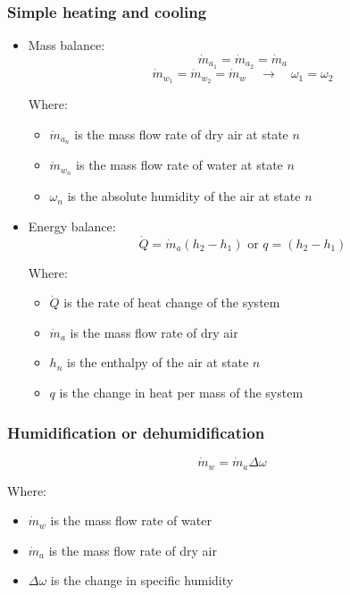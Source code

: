 \documentclass[11pt]{article}
\begin{document}
\subsubsection{Simple heating and cooling}
\label{sec:org114ebf3}
\begin{itemize}
\item Mass balance:
\[\dot{m}_{a_1} = \dot{m}_{a_2} = \dot{m}_a\]
\[\dot{m}_{w_1} = \dot{m}_{w_2} = \dot{m}_w \quad \rightarrow \quad \omega_1 = \omega_2\]

Where:
\begin{itemize}
\item \(\dot{m}_{a_n}\) is the mass flow rate of dry air at state \(n\)
\item \(\dot{m}_{w_n}\) is the mass flow rate of water at state \(n\)
\item \(\omega_n\) is the absolute humidity of the air at state \(n\)
\end{itemize}

\item Energy balance:
\[\dot{Q} = \dot{m}_a (h_2 - h_1) \text{ or } q = (h_2 - h_1)\]

Where:
\begin{itemize}
\item \(\dot{Q}\) is the rate of heat change of the system
\item \(\dot{m}_a\) is the mass flow rate of dry air
\item \(h_n\) is the enthalpy of the air at state \(n\)
\item \(q\) is the change in heat per mass of the system
\end{itemize}
\end{itemize}
\subsubsection{Humidification or dehumidification}
\label{sec:org0121c45}
\[\dot{m}_w = \dot{m}_a \Delta \omega\]

Where:
\begin{itemize}
\item \(\dot{m}_w\) is the mass flow rate of water
\item \(\dot{m}_a\) is the mass flow rate of dry air
\item \(\Delta \omega\) is the change in specific humidity
\end{itemize}

 \newpage
\end{document}
